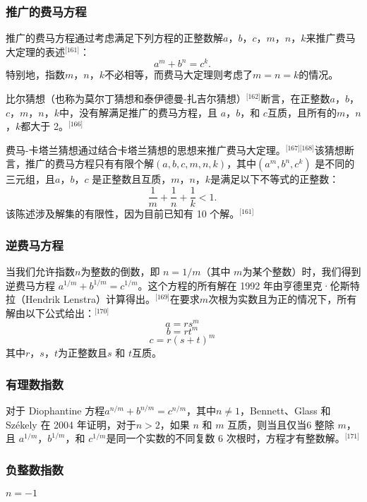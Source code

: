 \subsubsection{推广的费马方程}
推广的费马方程通过考虑满足下列方程的正整数解\( a \)，\( b \)，\( c \)，\( m \)，\( n \)，\( k \)来推广费马大定理的表述\(^\text{[161]}\)：
\[
a^m + b^n = c^k.~
\]
特别地，指数\( m \)，\( n \)，\( k \)不必相等，而费马大定理则考虑了\( m = n = k \)的情况。

比尔猜想（也称为莫尔丁猜想和泰伊德曼-扎吉尔猜想）\(^\text{[162]}\)断言，在正整数\( a \)，\( b \)，\( c \)，\( m \)，\( n \)，\( k \)中，没有解满足推广的费马方程，且 \( a \)，\( b \)，和 \( c \)互质，且所有的\( m \)，\( n \)，\( k \)都大于 2。\(^\text{[166]}\)

费马-卡塔兰猜想通过结合卡塔兰猜想的思想来推广费马大定理。\(^\text{[167][168]}\)该猜想断言，推广的费马方程只有有限个解\( (a, b, c, m, n, k) \)，其中\( (a^m, b^n, c^k) \) 是不同的三元组，且\( a \)，\( b \)，\( c \) 是正整数且互质，\( m \)，\( n \)，\( k \)是满足以下不等式的正整数：
\[
\frac{1}{m} + \frac{1}{n} + \frac{1}{k} < 1.~
\]
该陈述涉及解集的有限性，因为目前已知有 10 个解。\(^\text{[161]}\)

\subsubsection{逆费马方程}
当我们允许指数\( n \)为整数的倒数，即 \( n = 1/m \)（其中 \( m \)为某个整数）时，我们得到逆费马方程 \( a^{1/m} + b^{1/m} = c^{1/m} \)。这个方程的所有解在 1992 年由亨德里克·伦斯特拉（Hendrik Lenstra）计算得出。\(^\text{[169]}\)在要求\( m \)次根为实数且为正的情况下，所有解由以下公式给出：\(^\text{[170]}\)
\[
a = rs^m~
\]
\[
b = rt^m~
\]
\[
c = r(s+t)^m~
\]
其中\( r \)，\( s \)，\( t \)为正整数且\( s \) 和 \( t \)互质。
\subsubsection{有理数指数}
对于 Diophantine 方程\( a^{n/m} + b^{n/m} = c^{n/m} \)，其中\( n \neq 1 \)，Bennett、Glass 和 Székely 在 2004 年证明，对于\( n > 2 \)，如果 \( n \) 和 \( m \) 互质，则当且仅当\( 6 \) 整除 \( m \)，且 \( a^{1/m} \)，\( b^{1/m} \)，和 \( c^{1/m} \)是同一个实数的不同复数 6 次根时，方程才有整数解。\(^\text{[171]}\)
\subsubsection{负整数指数}

\textbf{\( n = -1 \)}

